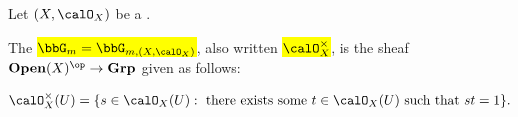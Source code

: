 \begin{definition} \label{definition:multiplicative_group_sheaf_on_a_ringed_space}
    Let $(X, \calO_X)$ be a .

    The  \hl{$\bbG_m = \bbG_{m,(X, \calO_X)}$}, also written \hl{$\calO_X^\times$}, is the sheaf $\mathbf{Open}(X)^{\op} \to \mathbf{Grp}$ given as follows:

    $$\calO_X^\times(U) = \{s \in \calO_X(U): \text{ there exists some } t \in \calO_X(U) \text{ such that } st = 1 \}.$$

\end{definition}